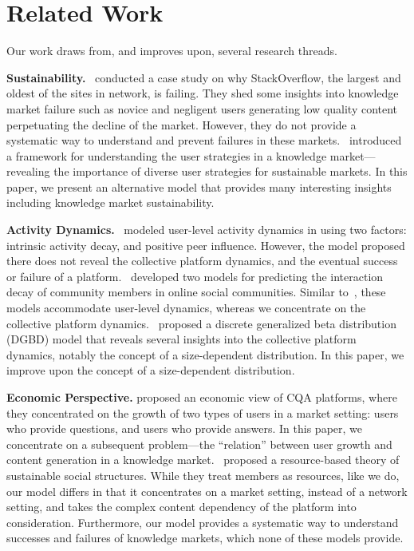 \section{Related Work}
Our work draws from, and improves upon, several research threads.

\textbf{Sustainability.}~\citet{srba2016stack} conducted a case study on why StackOverflow, the largest and oldest of the sites in  network, is failing. They shed some insights into knowledge market failure such as novice and negligent users generating low quality content perpetuating the decline of the market. However, they do not provide a systematic way to understand and prevent failures in these markets.~\citet{wu2016} introduced a framework for understanding the user strategies in a knowledge market---revealing the importance of diverse user strategies for sustainable markets. In this paper, we present an alternative model that provides many interesting insights including knowledge market sustainability.

\textbf{Activity Dynamics.}~\citet{walk2016} modeled user-level activity dynamics in  using two factors: intrinsic activity decay, and positive peer influence. However, the model proposed there does not reveal the collective platform dynamics, and the eventual success or failure of a platform.~\citet{abufouda2017} developed two models for predicting the interaction decay of community members in online social communities. Similar to~\citet{walk2016}, these models accommodate user-level dynamics, whereas we concentrate on the collective platform dynamics.~\citet{wu2011} proposed a discrete generalized beta distribution (DGBD) model that reveals several insights into the collective platform dynamics, notably the concept of a size-dependent distribution. In this paper, we improve upon the concept of a size-dependent distribution.  

\textbf{Economic Perspective.} \citet{Kumar2010} proposed an economic view of CQA platforms, where they concentrated on the growth of two types of users in a market setting: users who provide questions, and users who provide answers. In this paper, we concentrate on a subsequent problem---the ``relation'' between user growth and content generation in a knowledge market.~\citet{butler2001} proposed a resource-based theory of sustainable social structures. While they treat members as resources, like we do, our model differs in that it concentrates on a market setting, instead of a network setting, and takes the complex content dependency of the platform into consideration. Furthermore, our model provides a systematic way to understand successes and failures of knowledge markets, which none of these models provide.  

